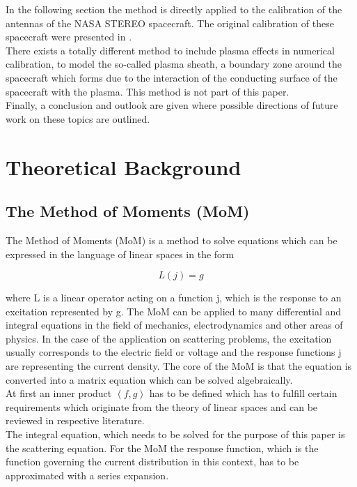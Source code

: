 \documentclass[draft,ras]{agutex}
\begin{document}
\begin{article}
In the following section the method is directly applied to the calibration of the antennas of the NASA STEREO spacecraft. The original calibration of these spacecraft were presented in \cite{ossi09}.\\

There exists a totally different method to include plasma effects in numerical calibration, to model the so-called plasma sheath, a boundary zone around the spacecraft which forms due to the interaction of the conducting surface of the spacecraft with the plasma. This method is not part of this paper.\\

Finally, a conclusion and outlook are given where possible directions of future work on these topics are outlined.

\section{Theoretical Background}
\subsection{The Method of Moments (MoM)}
The Method of Moments (MoM) is a method to solve equations which can be expressed in the language of linear spaces in the form

\begin{equation}\label{eq:linear_operator}
 L(j)=g
\end{equation}

where L is a linear operator acting on a function j, which is the response to an excitation represented by g. The MoM can be applied to many differential and integral equations in the field of mechanics, electrodynamics and other areas of physics. In the case of the application on scattering problems, the excitation usually corresponds to the electric field or voltage and the response functions j are representing the current density. The core of the MoM is that the equation is converted into a matrix equation which can be solved algebraically.\\

At first an inner product $\left\langle f,g\right\rangle$ has to be defined which has to fulfill certain requirements which originate from the theory of linear spaces and can be reviewed in respective literature.\\

The integral equation, which needs to be solved for the purpose of this paper is the scattering equation. For the MoM the response function, which is the function governing the current distribution in this context, has to be approximated with a series expansion.


\end{article}
\end{document}
